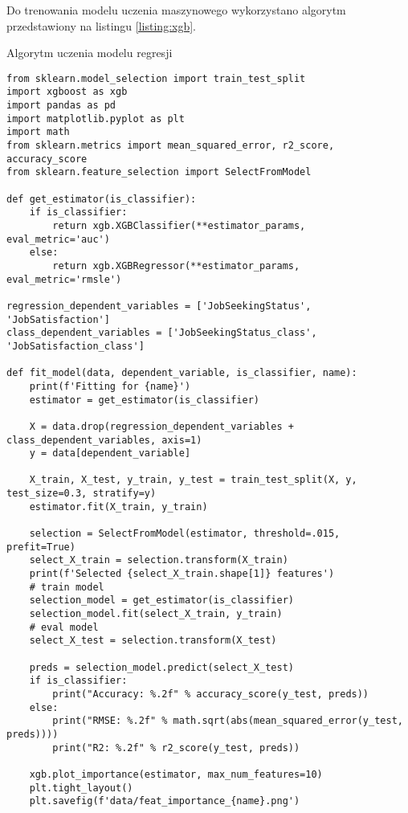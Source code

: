 Do trenowania modelu uczenia maszynowego wykorzystano algorytm przedstawiony na listingu \ref{listing:xgb}.

\begin{listing}[h!]
    \caption{Algorytm uczenia modelu regresji} \label{listing:xgb}
    \begin{verbatim}
from sklearn.model_selection import train_test_split
import xgboost as xgb
import pandas as pd
import matplotlib.pyplot as plt
import math
from sklearn.metrics import mean_squared_error, r2_score, accuracy_score
from sklearn.feature_selection import SelectFromModel

def get_estimator(is_classifier):
    if is_classifier:
        return xgb.XGBClassifier(**estimator_params, eval_metric='auc')
    else:
        return xgb.XGBRegressor(**estimator_params, eval_metric='rmsle')

regression_dependent_variables = ['JobSeekingStatus', 'JobSatisfaction']
class_dependent_variables = ['JobSeekingStatus_class', 'JobSatisfaction_class']

def fit_model(data, dependent_variable, is_classifier, name):
    print(f'Fitting for {name}')
    estimator = get_estimator(is_classifier)

    X = data.drop(regression_dependent_variables + class_dependent_variables, axis=1)
    y = data[dependent_variable]

    X_train, X_test, y_train, y_test = train_test_split(X, y, test_size=0.3, stratify=y)
    estimator.fit(X_train, y_train)

    selection = SelectFromModel(estimator, threshold=.015, prefit=True)
    select_X_train = selection.transform(X_train)
    print(f'Selected {select_X_train.shape[1]} features')
    # train model
    selection_model = get_estimator(is_classifier)
    selection_model.fit(select_X_train, y_train)
    # eval model
    select_X_test = selection.transform(X_test)

    preds = selection_model.predict(select_X_test)
    if is_classifier:
        print("Accuracy: %.2f" % accuracy_score(y_test, preds))
    else:
        print("RMSE: %.2f" % math.sqrt(abs(mean_squared_error(y_test, preds))))
        print("R2: %.2f" % r2_score(y_test, preds))

    xgb.plot_importance(estimator, max_num_features=10)
    plt.tight_layout()
    plt.savefig(f'data/feat_importance_{name}.png')
    \end{verbatim}
    \raggedright\source{\ownwork}
\end{listing}

